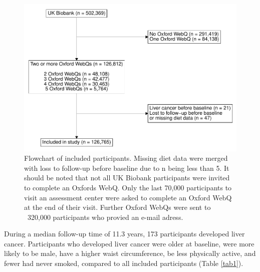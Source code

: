 \documentclass[nutrients,article,submit,moreauthors,pdftex]{Definitions/mdpi}
\begin{document}
\begin{figure}

{\centering \includegraphics[width=1\linewidth,]{legliv-nutrients_files/figure-latex/fig1-1} 

}

\caption{Flowchart of included participants. Missing diet data were merged with loss to follow-up before baseline due to n being less than 5. It should be noted that not all UK Biobank participants were invited to complete an Oxfords WebQ. Only the last 70,000 participants to visit an assessment center were asked to complete an Oxford WebQ at the end of their visit. Further Oxford WebQs were sent to ~320,000 participants who provied an e-mail adress.}\label{fig:fig1}
\end{figure}

During a median follow-up time of 11.3 years, 173 participants developed
liver cancer. Participants who developed liver cancer were older at
baseline, were more likely to be male, have a higher waist
circumference, be less physically active, and fewer had never smoked,
compared to all included participants (Table \ref{tab1}).
\end{document}
